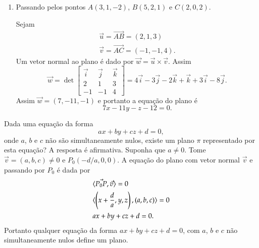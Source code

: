 \begin{exemplos}
\begin{enumerate}
\begin{solucao}
\begin{figure}[!h]
            \end{figure}
        \end{solucao}
        \item Passando pelos pontos $A(3,1,-2)$, $B(5,2,1)$ e $C(2,0,2)$.
        \begin{solucao}
            Sejam
            \begin{align*}
                \vec{u} = \vec{AB} = (2,1,3)\\
                \vec{v} = \vec{AC} = (-1,-1,4).
            \end{align*}
            Um vetor normal ao plano \'e dado por $\vec{w} = \vec{u}\times\vec{v}$. Assim
            \[
                \vec{w} = \det \begin{bmatrix}
                    \vec{i} & \vec{j} & \vec{k}\\
                    2 & 1 & 3\\
                    -1 & -1 & 4
                \end{bmatrix} = 4\vec{i} - 3\vec{j} - 2\vec{k} + \vec{k} + 3\vec{i} - 8\vec{j}.
            \]
            Assim $\vec{w} = (7,-11,-1)$ e portanto a equa\c{c}\~ao do plano \'e
            \[
                7x - 11y - z - 12 = 0.
            \]
        \end{solucao}
    \end{enumerate}
\end{exemplos}

Dada uma equa\c{c}\~ao da forma
    \[
        ax + by + cz + d = 0,
    \]
onde $a$, $b$ e $c$ n\~ao s\~ao simultaneamente nulos, existe um plano $\pi$ representado por esta equa\c{c}\~ao? A resposta \'e afirmativa. Suponha que $a \ne 0$. Tome $\vec{v} = (a,b,c) \ne 0$ e $P_0(-d/a,0,0)$. A equa\c{c}\~ao do plano com vetor normal $\vec{v}$ e passando por $P_0$ \'e dada por
    \begin{align*}
        &\langle \vec{P_0P}, \vec{v} \rangle = 0\\
        &\langle\left(x + \dfrac{d}{a},y,z\right), (a,b,c)\rangle = 0\\
        &ax + by + cz + d = 0.
    \end{align*}
Portanto qualquer equa\c{c}\~ao da forma $ax + by + cz + d = 0$, com $a$, $b$ e $c$ n\~ao simultaneamente nulos define um plano.

